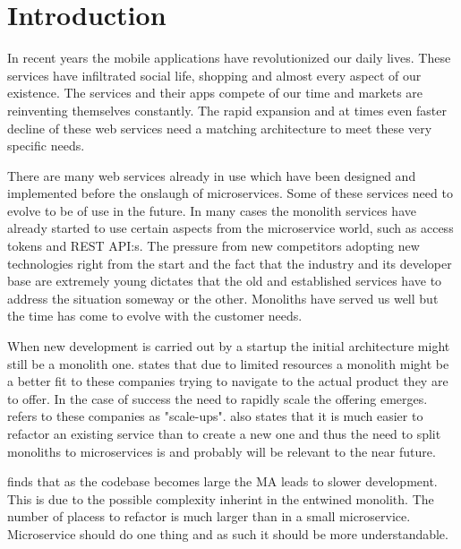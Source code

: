
\section{Introduction}
\begin{sloppypar}
    In recent years the mobile applications have revolutionized our daily lives. 
    These services have infiltrated social life, shopping and almost every 
    aspect of our existence. The services and their apps compete of our time and
    markets are reinventing themselves constantly. The rapid expansion and at 
    times even faster decline of these web services need a matching architecture 
    to meet these very specific needs. 
\end{sloppypar}
\begin{sloppypar}
    There are many web services already in use which have been designed and 
    implemented before the onslaugh of microservices. Some of these services 
    need to evolve to be of use in the future. In many cases the monolith 
    services have already started to use certain aspects from the microservice 
    world, such as access tokens and REST API:s. The pressure from new 
    competitors adopting new technologies right from the start and the fact 
    that the industry and its developer base are extremely young dictates that 
    the old and established services have to address the situation someway or 
    the other. Monoliths have served us well but the time has come to evolve 
    with the customer needs.
\end{sloppypar}
\begin{sloppypar}
    When new development is carried out by a startup the initial architecture 
    might still be a monolith one. \citet{newman2019} states that due to limited 
    resources a monolith might be a better fit to these companies trying to 
    navigate to the actual product they are to offer. In the case of success 
    the need to rapidly scale the offering emerges. \citet{newman2019} refers 
    to these companies as "scale-ups". \citet{newman2019} also states that it 
    is much easier to refactor an existing service than to create a new one and
    thus the need to split monoliths to microservices is and probably will be 
    relevant to the near future.
\end{sloppypar}
\begin{sloppypar}
    \citet{10.1007/978-3-319-74433-9_3} finds that as the codebase becomes large 
    the MA leads to slower development. This is due to the possible complexity
    inherint in the entwined monolith. The number of placess to refactor is much 
    larger than in a small microservice. Microservice should do one thing and as 
    such it should be more understandable.
\end{sloppypar} 

